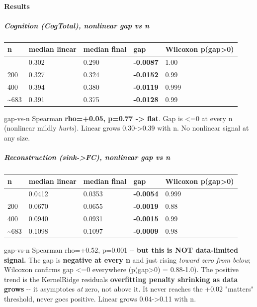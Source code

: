 \paragraph{Results}\label{results}

\subparagraph{Cognition (CogTotal), nonlinear gap vs n}\label{cognition-cogtotal-nonlinear-gap-vs-n}

{\def\LTcaptype{none} %
\begin{longtable}[]{@{}lllll@{}}
\toprule\noalign{}
n & median linear & median final & \textbf{gap} & Wilcoxon p(gap\textgreater0) \\
\midrule\noalign{}
\endhead
\bottomrule\noalign{}
\endlastfoot
100 & 0.302 & 0.290 & \textbf{-0.0087} & 1.00 \\
200 & 0.327 & 0.324 & \textbf{-0.0152} & 0.99 \\
400 & 0.394 & 0.380 & \textbf{-0.0119} & 0.999 \\
\textasciitilde683 & 0.391 & 0.375 & \textbf{-0.0128} & 0.99 \\
\end{longtable}
}

gap-vs-n Spearman \textbf{rho=+0.05, p=0.77 -\textgreater{} flat}. Gap is \textless=0 at every n (nonlinear mildly \emph{hurts}). Linear grows 0.30-\textgreater0.39 with n. No nonlinear signal at any size.

\subparagraph{Reconstruction (sink-\textgreater FC), nonlinear gap vs n}\label{reconstruction-sink-fc-nonlinear-gap-vs-n}

{\def\LTcaptype{none} %
\begin{longtable}[]{@{}lllll@{}}
\toprule\noalign{}
n & median linear & median final & \textbf{gap} & Wilcoxon p(gap\textgreater0) \\
\midrule\noalign{}
\endhead
\bottomrule\noalign{}
\endlastfoot
100 & 0.0412 & 0.0353 & \textbf{-0.0054} & 0.999 \\
200 & 0.0670 & 0.0655 & \textbf{-0.0019} & 0.88 \\
400 & 0.0940 & 0.0931 & \textbf{-0.0015} & 0.99 \\
\textasciitilde683 & 0.1098 & 0.1097 & \textbf{-0.0009} & 0.98 \\
\end{longtable}
}

gap-vs-n Spearman rho=+0.52, p=0.001 -\/- \textbf{but this is NOT data-limited signal.} The gap is \textbf{negative at every n} and just rising \emph{toward zero from below}; Wilcoxon confirms gap \textless=0 everywhere (p(gap\textgreater0) = 0.88-1.0). The positive trend is the KernelRidge residual\textquotesingle s \textbf{overfitting penalty shrinking as data grows} -\/- it asymptotes \emph{at} zero, not above it. It never reaches the +0.02 "matters" threshold, never goes positive. Linear grows 0.04-\textgreater0.11 with n.


